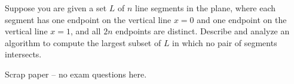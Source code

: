\documentclass[12pt,answers,addpoints]{exam}
\begin{document}
\begin{questions}
    \newpage

  \question[20] Suppose you are given a set $L$ of $n$ line segments
    in the plane, where each segment has one endpoint on the vertical
    line $x = 0$ and one endpoint on the vertical line $x = 1$, and
    all $2n$ endpoints are distinct. Describe and analyze an algorithm
    to compute the largest subset of $L$ in which no pair of segments
    intersects.


  
\end{questions}
\newpage
\begin{center}
Scrap paper -- no exam questions here.  
\end{center}
\end{document}
